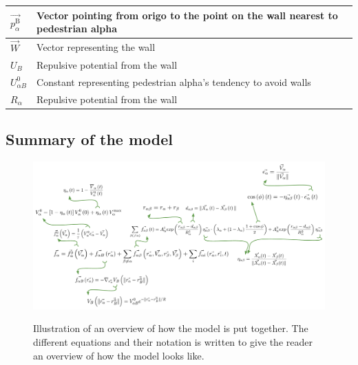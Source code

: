 \begin{center}
\begin{tabular}{lll}
\hline
$\overrightarrow{p_{\alpha}^{\text{B}}}$& Vector pointing from origo to the point on the wall nearest to pedestrian alpha &\\
\hline
$\overrightarrow{W}$& Vector representing the wall &\\
\hline
$U_{B}$ & Repulsive potential from the wall\\
\hline
$U^{0}_{\alpha B}$ & Constant representing pedestrian alpha's tendency to avoid walls\\
\hline
$R_{\alpha}$& Repulsive potential from the wall\\
\hline
\end{tabular}
\end{center}

\subsection{Summary of the model}
\begin{figure}[hb] %
    \centering
    {\includegraphics[scale=0.35]{Figures/overview.pdf}} 
    \caption[Overview of the model]{Illustration of an overview of how the model is put together. The different equations and their notation is written to give the 
	     reader an overview of how the model looks like.}
    \label{overview}
\end{figure}

